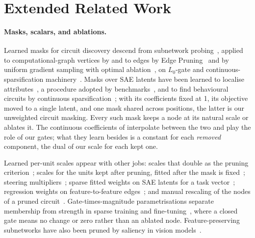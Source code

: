 \documentclass[10pt]{article}
\begin{document}
\section{Extended Related Work}
\label{app:related}

\paragraph{Masks, scalars, and ablations.}
Learned masks for circuit discovery descend from subnetwork probing~\citep{cao2021low}, applied to computational-graph vertices by \citet{conmy2023towards} and to edges by Edge Pruning~\citep{bhaskar2024finding} and by uniform gradient sampling with optimal ablation~\citep{li2024optimal}, on $L_0$-gate and continuous-sparsification machinery~\citep{louizos2018learning, savarese2020winning}.
Masks over SAE latents have been learned to localise attributes~\citep{chaudhary2024evaluating}, a procedure adopted by benchmarks~\citep{mueller2025mib, karvonen2025saebench}, and to find behavioural circuits by continuous sparsification~\citep{caples2025scaling}; with its coefficients fixed at 1, its objective moved to a single latent, and one mask shared across positions, the latter is our unweighted circuit masking.
Every such mask keeps a node at its natural scale or ablates it.
The continuous coefficients of \citet{li2024optimal} interpolate between the two and play the role of our gates; what they learn besides is a constant for each \emph{removed} component, the dual of our scale for each kept one.

Learned per-unit scales appear with other jobs: scales that double as the pruning criterion~\citep{liu2017learning, huang2018data, you2019gate}; scales for the units kept after pruning, fitted after the mask is fixed~\citep{kwon2022fast, he2017channel}; steering multipliers~\citep{stoehr2024activation}; sparse fitted weights on SAE latents for a task vector~\citep{kharlapenko2025scaling}; regression weights on feature-to-feature edges~\citep{yin2026scalable}; and manual rescaling of the nodes of a pruned circuit~\citep{gao2025weightsparse}.
Gate-times-magnitude parametrisations separate membership from strength in sparse training and fine-tuning~\citep{louizos2018learning, guo2021parameter, lai2025joint}, where a closed gate means no change or zero rather than an ablated node.
Feature-preserving subnetworks have also been pruned by saliency in vision models~\citep{hamblin2022pruning}.
\end{document}
